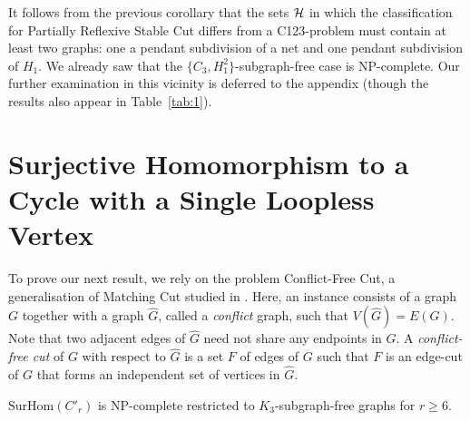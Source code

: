 \documentclass[a4paper,UKenglish,cleveref, autoref,thm-restate]{lipics-v2021}
\newcommand{\SurHom}{\ensuremath{\mathrm{SurHom}}}
\begin{document}
It follows from the previous corollary that the sets $\cal{H}$ in which the classification for {\sc Partially Reflexive Stable Cut} differs from a C123-problem must contain at least two graphs: one a pendant subdivision of a net and one pendant subdivision of $H_1$. We already saw that the $\{C_3,H_1^2\}$-subgraph-free case is NP-complete. Our further examination in this vicinity is deferred to the appendix (though the results also appear in Table~\ref{tab:1}).


\section{Surjective Homomorphism to a Cycle with a Single Loopless Vertex}\label{s-new}

To prove our next result, we rely on the problem {\sc Conflict-Free Cut}, a generalisation of {\sc Matching Cut} studied in \cite{RAUCH2025106503}. Here, an instance consists of a graph $G$ together with a graph $\hat{G}$, called a {\it conflict} graph, such that $V(\hat{G})=E(G)$. Note that two adjacent edges of $\hat{G}$ need not share any endpoints in $G$. A {\it conflict-free cut} of $G$ with respect to $\hat{G}$ is a set $F$ of edges of $G$ such that $F$ is an edge-cut of $G$ that forms an independent set of vertices in $\hat{G}$.
\begin{theorem}
\label{thm:C'r-triangle-free}
\SurHom$(C'_r)$ is NP-complete restricted to $K_3$-subgraph-free graphs for $r \geq 6$.
\end{theorem}
\end{document}
